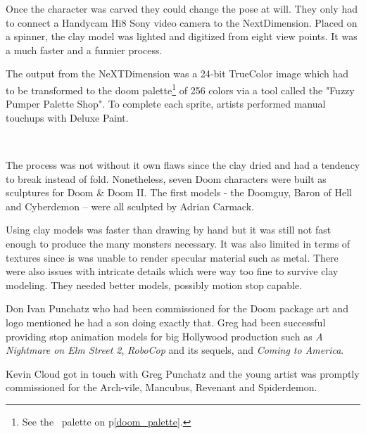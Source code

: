 \vspace{-4mm}
Once the character was carved they could change the pose at will. They only had to connect a Handycam Hi8 Sony video camera to the NextDimension. Placed on a spinner, the clay model was lighted and digitized from eight view points. It was a much faster and a funnier process.\\
\par
The output from the NeXTDimension was a 24-bit TrueColor image which had to be transformed to the doom palette\footnote{See the \doom~palette on p\ref{doom_palette}.} of 256 colors via a tool called the "Fuzzy Pumper Palette Shop". To complete each sprite, artists performed manual touchups with Deluxe Paint.\\
\par
{}\\
\par
The process was not without it own flaws since the clay dried and had a tendency to break instead of fold. Nonetheless, seven Doom characters were built as sculptures for Doom \& Doom II. The first models - the Doomguy, Baron of Hell and Cyberdemon -- were all sculpted by Adrian Carmack.\\
\par
{}

\par
{}




\vspace{-4mm}
Using clay models was faster than drawing by hand but it was still not fast enough to produce the many monsters necessary. It was also limited in terms of textures since is was unable to render specular material such as metal. There were also issues with intricate details which were way too fine to survive clay modeling. They needed better models, possibly motion stop capable.\\
\par
Don Ivan Punchatz who had been commissioned for the Doom package art and logo mentioned he had a son doing exactly that. Greg had been successful providing stop animation models for big Hollywood production such as \textit{A Nightmare on Elm Street 2}, \textit{RoboCop} and its sequels, and \textit{Coming to America}. \\
\par
Kevin Cloud got in touch with Greg Punchatz and the young artist was promptly commissioned for the Arch-vile, Mancubus, Revenant and Spiderdemon.\\
\par

